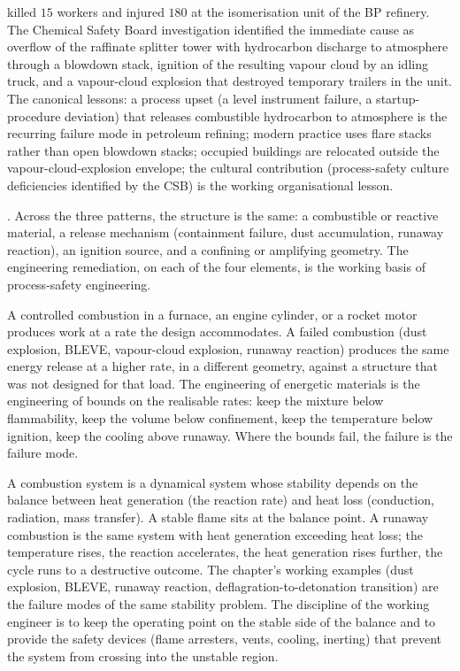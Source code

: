\cite{acc:csb-bp-texas-city-2007} killed $15$ workers and injured
$180$ at the isomerisation unit of the BP refinery. The Chemical
Safety Board investigation identified the immediate cause as
overflow of the raffinate splitter tower with hydrocarbon discharge
to atmosphere through a blowdown stack, ignition of the resulting
vapour cloud by an idling truck, and a vapour-cloud explosion that
destroyed temporary trailers in the unit. The canonical lessons: a
process upset (a level instrument failure, a startup-procedure
deviation) that releases combustible hydrocarbon to atmosphere is the
recurring failure mode in petroleum refining; modern practice uses
flare stacks rather than open blowdown stacks; occupied buildings are
relocated outside the vapour-cloud-explosion envelope; the cultural
contribution (process-safety culture deficiencies identified by the
CSB) is the working organisational lesson.

.
Across the three patterns, the structure is the same: a combustible
or reactive material, a release mechanism (containment failure, dust
accumulation, runaway reaction), an ignition source, and a confining
or amplifying geometry. The engineering remediation, on each of the
four elements, is the working basis of process-safety engineering.

\begin{principle}
A controlled combustion in a furnace, an engine cylinder, or a rocket
motor produces work at a rate the design accommodates. A failed
combustion (dust explosion, BLEVE, vapour-cloud explosion, runaway
reaction) produces the same energy release at a higher rate, in a
different geometry, against a structure that was not designed for
that load. The engineering of energetic materials is the engineering
of bounds on the realisable rates: keep the mixture below flammability,
keep the volume below confinement, keep the temperature below ignition,
keep the cooling above runaway. Where the bounds fail, the failure is
the failure mode.
\end{principle}

\begin{archetype}
A combustion system is a dynamical system whose stability depends on
the balance between heat generation (the reaction rate) and heat loss
(conduction, radiation, mass transfer). A stable flame sits at the
balance point. A runaway combustion is the same system with heat
generation exceeding heat loss; the temperature rises, the reaction
accelerates, the heat generation rises further, the cycle runs to a
destructive outcome. The chapter's working examples (dust explosion,
BLEVE, runaway reaction, deflagration-to-detonation transition) are
the failure modes of the same stability problem. The discipline of
the working engineer is to keep the operating point on the stable
side of the balance and to provide the safety devices (flame
arresters, vents, cooling, inerting) that prevent the system from
crossing into the unstable region.
\end{archetype}


